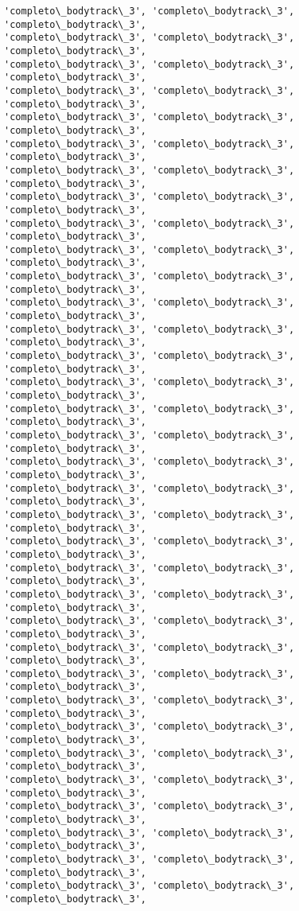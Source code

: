 \documentclass[11pt]{article}
\begin{document}
\begin{Verbatim}[commandchars=\\\{\}]
'completo\_bodytrack\_3', 'completo\_bodytrack\_3', 'completo\_bodytrack\_3',
'completo\_bodytrack\_3', 'completo\_bodytrack\_3', 'completo\_bodytrack\_3',
'completo\_bodytrack\_3', 'completo\_bodytrack\_3', 'completo\_bodytrack\_3',
'completo\_bodytrack\_3', 'completo\_bodytrack\_3', 'completo\_bodytrack\_3',
'completo\_bodytrack\_3', 'completo\_bodytrack\_3', 'completo\_bodytrack\_3',
'completo\_bodytrack\_3', 'completo\_bodytrack\_3', 'completo\_bodytrack\_3',
'completo\_bodytrack\_3', 'completo\_bodytrack\_3', 'completo\_bodytrack\_3',
'completo\_bodytrack\_3', 'completo\_bodytrack\_3', 'completo\_bodytrack\_3',
'completo\_bodytrack\_3', 'completo\_bodytrack\_3', 'completo\_bodytrack\_3',
'completo\_bodytrack\_3', 'completo\_bodytrack\_3', 'completo\_bodytrack\_3',
'completo\_bodytrack\_3', 'completo\_bodytrack\_3', 'completo\_bodytrack\_3',
'completo\_bodytrack\_3', 'completo\_bodytrack\_3', 'completo\_bodytrack\_3',
'completo\_bodytrack\_3', 'completo\_bodytrack\_3', 'completo\_bodytrack\_3',
'completo\_bodytrack\_3', 'completo\_bodytrack\_3', 'completo\_bodytrack\_3',
'completo\_bodytrack\_3', 'completo\_bodytrack\_3', 'completo\_bodytrack\_3',
'completo\_bodytrack\_3', 'completo\_bodytrack\_3', 'completo\_bodytrack\_3',
'completo\_bodytrack\_3', 'completo\_bodytrack\_3', 'completo\_bodytrack\_3',
'completo\_bodytrack\_3', 'completo\_bodytrack\_3', 'completo\_bodytrack\_3',
'completo\_bodytrack\_3', 'completo\_bodytrack\_3', 'completo\_bodytrack\_3',
'completo\_bodytrack\_3', 'completo\_bodytrack\_3', 'completo\_bodytrack\_3',
'completo\_bodytrack\_3', 'completo\_bodytrack\_3', 'completo\_bodytrack\_3',
'completo\_bodytrack\_3', 'completo\_bodytrack\_3', 'completo\_bodytrack\_3',
'completo\_bodytrack\_3', 'completo\_bodytrack\_3', 'completo\_bodytrack\_3',
'completo\_bodytrack\_3', 'completo\_bodytrack\_3', 'completo\_bodytrack\_3',
'completo\_bodytrack\_3', 'completo\_bodytrack\_3', 'completo\_bodytrack\_3',
'completo\_bodytrack\_3', 'completo\_bodytrack\_3', 'completo\_bodytrack\_3',
'completo\_bodytrack\_3', 'completo\_bodytrack\_3', 'completo\_bodytrack\_3',
'completo\_bodytrack\_3', 'completo\_bodytrack\_3', 'completo\_bodytrack\_3',
'completo\_bodytrack\_3', 'completo\_bodytrack\_3', 'completo\_bodytrack\_3',
'completo\_bodytrack\_3', 'completo\_bodytrack\_3', 'completo\_bodytrack\_3',
'completo\_bodytrack\_3', 'completo\_bodytrack\_3', 'completo\_bodytrack\_3',
'completo\_bodytrack\_3', 'completo\_bodytrack\_3', 'completo\_bodytrack\_3',
'completo\_bodytrack\_3', 'completo\_bodytrack\_3', 'completo\_bodytrack\_3',
'completo\_bodytrack\_3', 'completo\_bodytrack\_3', 'completo\_bodytrack\_3',

\end{Verbatim}
\end{document}

